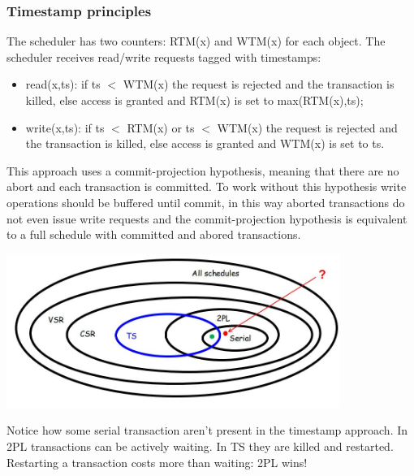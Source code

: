 \subsubsection{Timestamp principles}
The scheduler has two counters: RTM(x) and WTM(x) for each object.\newline
\newline
The scheduler receives read/write requests tagged with timestamps:
\begin{itemize}
    \item read(x,ts): if ts $<$ WTM(x) the request is rejected and the transaction is killed, else access is granted and RTM(x) is set to max(RTM(x),ts);
    \item write(x,ts): if ts $<$ RTM(x) or ts $<$ WTM(x) the request is rejected and the transaction is killed, else access is granted and WTM(x) is set to ts.
\end{itemize}
This approach uses a commit-projection hypothesis, meaning that there are no abort and each transaction is committed.\newline
To work without this hypothesis write operations should be buffered until commit, in this way aborted transactions do not even issue write requests and the commit-projection hypothesis is equivalent to a full schedule with committed and abored transactions.
\begin{center}
    \includegraphics[height=5cm]{../arguments/tsand2pl.JPG}
\end{center}
Notice how some serial transaction aren't present in the timestamp approach.\newline
\newline
In 2PL transactions can be actively waiting. In TS they are
killed and restarted. Restarting a transaction costs more than waiting: 2PL wins!
